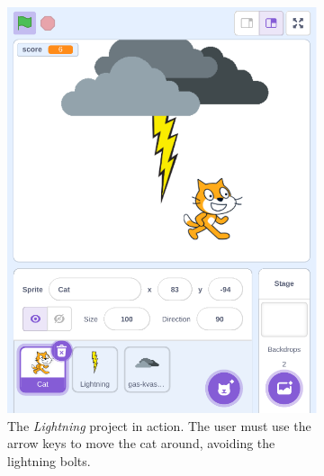 \documentclass[../main]{subfiles}
\begin{document}
\begin{figure}
    \begin{wide}
        \begin{subfigure}[T]{0.49\linewidth}
            \includegraphics[width=\linewidth]{lightning-game}
            \caption{
                The \textit{Lightning} project in action.
                The user must use the arrow keys to move the cat around, avoiding the lightning bolts.
            }
            \label{fig:the-game-lightning}
        \end{subfigure}
        \begin{subfigure}[T]{0.49\linewidth}

\end{subfigure}
\end{wide}
\end{figure}
\end{document}
